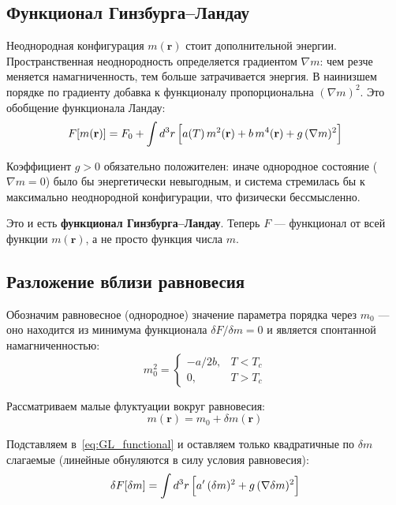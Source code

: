 \documentclass[../general/general]{subfiles}
\begin{document}
\subsection{Функционал Гинзбурга--Ландау}

Неоднородная конфигурация $m(\mathbf{r})$ стоит дополнительной энергии. Пространственная неоднородность определяется градиентом $\nabla m$: чем резче меняется намагниченность, тем больше затрачивается энергия. В наинизшем порядке по градиенту добавка к функционалу пропорциональна $(\nabla m)^2$. Это обобщение функционала Ландау:
\begin{equation}
    F[m(\mathbf{r})] = F_0 + \int d^3r\,\Bigl[a(T)\,m^2(\mathbf{r}) + b\,m^4(\mathbf{r}) + g\,(\nabla m)^2\Bigr]
    \label{eq:GL_functional}
\end{equation}

Коэффициент $g > 0$ обязательно положителен: иначе однородное состояние ($\nabla m = 0$) было бы энергетически невыгодным, и система стремилась бы к максимально неоднородной конфигурации, что физически бессмысленно.

Это и есть \textbf{функционал Гинзбурга--Ландау}. Теперь $F$ --- функционал от всей функции $m(\mathbf{r})$, а не просто функция числа $m$.

\subsection{Разложение вблизи равновесия}

Обозначим равновесное (однородное) значение параметра порядка через $m_0$ --- оно находится из минимума функционала $\delta F/\delta m = 0$ и является спонтанной намагниченностью:
\begin{equation}
    m_0^2 = \begin{cases} -a/2b, & T < T_c \\ 0, & T > T_c \end{cases}
\end{equation}

Рассматриваем малые флуктуации вокруг равновесия:
\begin{equation}
    m(\mathbf{r}) = m_0 + \delta m(\mathbf{r})
\end{equation}

Подставляем в~\eqref{eq:GL_functional} и оставляем только квадратичные по $\delta m$ слагаемые (линейные обнуляются в силу условия равновесия):
\begin{equation}
    \delta F[\delta m] = \int d^3r\,\Bigl[a'\,(\delta m)^2 + g\,(\nabla\delta m)^2\Bigr]
    \label{eq:delta_F}
\end{equation}
\end{document}
